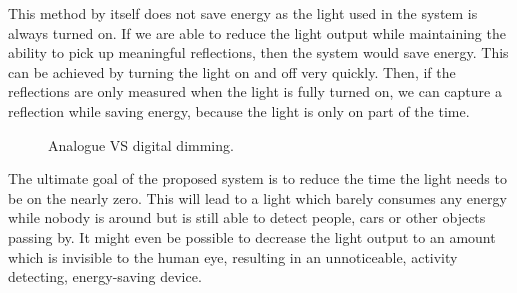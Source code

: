 This method by itself does not save energy as the light used in the system is always turned on. If we are able to reduce the light output while maintaining the ability to pick up meaningful reflections, then the system would save energy. This can be achieved by turning the light on and off very quickly. Then, if the reflections are only measured when the light is fully turned on, we can capture a reflection while saving energy, because the light is only on part of the time.
\begin{figure}[]
	\centering     %
	\caption{Analogue VS digital dimming.\label{fig:Introduction}}
\end{figure}

The ultimate goal of the proposed system is to reduce the time the light needs to be on the nearly zero. This will lead to a light which barely consumes any energy while nobody is around but is still able to detect people, cars or other objects passing by. It might even be possible to decrease the light output to an amount which is invisible to the human eye, resulting in an unnoticeable, activity detecting, energy-saving device.

